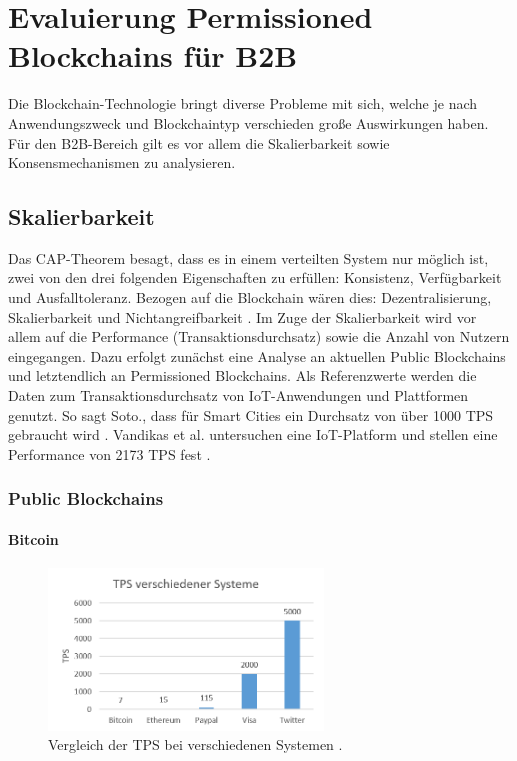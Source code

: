 \chapter{Evaluierung Permissioned Blockchains für B2B}
\label{cha:b2b-eval}

Die Blockchain-Technologie bringt diverse Probleme mit sich, welche je nach Anwendungszweck und Blockchaintyp verschieden große Auswirkungen haben. Für den B2B-Bereich gilt es vor allem die Skalierbarkeit sowie Konsensmechanismen zu analysieren.

\section{Skalierbarkeit}
\label{sec:scalability-eval}
Das CAP-Theorem besagt, dass es in einem verteilten System nur möglich ist, zwei von den drei folgenden Eigenschaften zu erfüllen: Konsistenz, Verfügbarkeit und Ausfalltoleranz. Bezogen auf die Blockchain wären dies: Dezentralisierung, Skalierbarkeit und Nichtangreifbarkeit \cite{SchererPerformanceScalabilityBlockchain2017}. Im Zuge der Skalierbarkeit wird vor allem auf die Performance (Transaktionsdurchsatz) sowie die Anzahl von Nutzern  eingegangen. Dazu erfolgt zunächst eine Analyse an aktuellen Public Blockchains und letztendlich an Permissioned Blockchains. Als Referenzwerte werden die Daten zum Transaktionsdurchsatz von IoT-Anwendungen und Plattformen genutzt. So sagt Soto., dass für Smart Cities ein Durchsatz von über 1000 \acs{TPS} gebraucht wird \cite{AraujoSotoPerformanceevaluationscalable2017}. Vandikas et al. untersuchen eine IoT-Platform und stellen eine Performance von 2173 \acs{TPS} fest \cite{VandikasPerformanceEvaluationIoT2014a}. 

\subsection{Public Blockchains}


\subsubsection{Bitcoin}

\begin{figure}[!htbp]
  \centering
    \includegraphics[width=0.65\textwidth,angle=0]{images/tps-comparison}
    \caption{Vergleich der TPS bei verschiedenen Systemen \cite[S.~28]{SwanBlockchainblueprintnew2015}\cite{BitcoinTeamScalabilityBitcoinWiki}.}
    \label{fig:tps-comparison}
\end{figure} 

